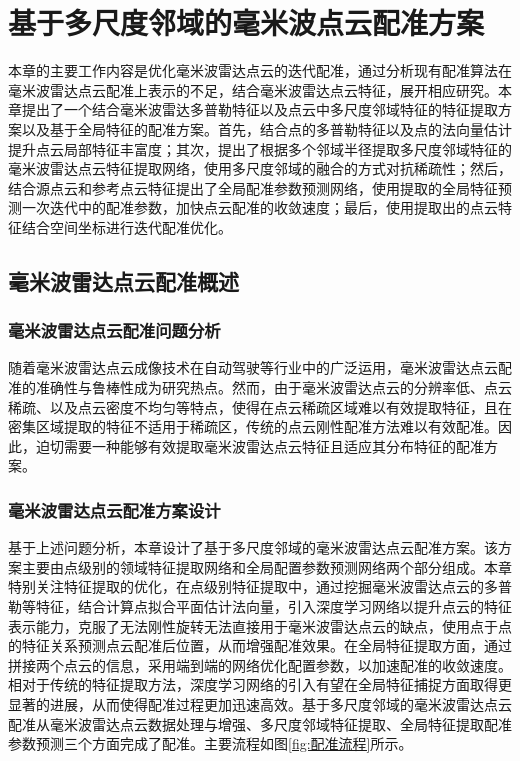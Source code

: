 \chapter{基于多尺度邻域的毫米波点云配准方案}
本章的主要工作内容是优化毫米波雷达点云的迭代配准，通过分析现有配准算法在毫米波雷达点云配准上表示的不足，结合毫米波雷达点云特征，展开相应研究。本章提出了一个结合毫米波雷达多普勒特征以及点云中多尺度邻域特征的特征提取方案以及基于全局特征的配准方案。首先，结合点的多普勒特征以及点的法向量估计提升点云局部特征丰富度；其次，提出了根据多个邻域半径提取多尺度邻域特征的毫米波雷达点云特征提取网络，使用多尺度邻域的融合的方式对抗稀疏性；然后，结合源点云和参考点云特征提出了全局配准参数预测网络，使用提取的全局特征预测一次迭代中的配准参数，加快点云配准的收敛速度；最后，使用提取出的点云特征结合空间坐标进行迭代配准优化。

\section{毫米波雷达点云配准概述}
\subsection{毫米波雷达点云配准问题分析}
随着毫米波雷达点云成像技术在自动驾驶等行业中的广泛运用，毫米波雷达点云配准的准确性与鲁棒性成为研究热点。然而，由于毫米波雷达点云的分辨率低、点云稀疏、以及点云密度不均匀等特点，使得在点云稀疏区域难以有效提取特征，且在密集区域提取的特征不适用于稀疏区，传统的点云刚性配准方法难以有效配准。因此，迫切需要一种能够有效提取毫米波雷达点云特征且适应其分布特征的配准方案。
\subsection{毫米波雷达点云配准方案设计}
基于上述问题分析，本章设计了基于多尺度邻域的毫米波雷达点云配准方案。该方案主要由点级别的领域特征提取网络和全局配置参数预测网络两个部分组成。本章特别关注特征提取的优化，在点级别特征提取中，通过挖掘毫米波雷达点云的多普勒等特征，结合计算点拟合平面估计法向量，引入深度学习网络以提升点云的特征表示能力，克服了无法刚性旋转无法直接用于毫米波雷达点云的缺点，使用点于点的特征关系预测点云配准后位置，从而增强配准效果。在全局特征提取方面，通过拼接两个点云的信息，采用端到端的网络优化配置参数，以加速配准的收敛速度。相对于传统的特征提取方法，深度学习网络的引入有望在全局特征捕捉方面取得更显著的进展，从而使得配准过程更加迅速高效。基于多尺度邻域的毫米波雷达点云配准从毫米波雷达点云数据处理与增强、多尺度邻域特征提取、全局特征提取配准参数预测三个方面完成了配准。主要流程如图\ref{fig:配准流程}所示。


